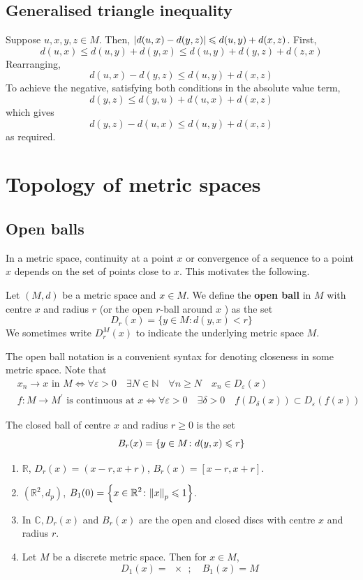 \documentclass[a4paper]{article}
\begin{document}
\subsection{Generalised triangle inequality}
Suppose \( u,x,y,z \in M \).
Then, \( \abs{d(u,x) - d(y,z)} \leqslant d(u,y) + d(x,z) \).
First,
\[
	d(u,x) \leq d(u,y) + d(y,x) \leq d(u,y) + d(y,z) + d(z,x)
\]
Rearranging,
\[
	d(u,x)-d(y,z) \leq d(u,y) + d(x,z)
\]
To achieve the negative, satisfying both conditions in the absolute value term,
\[
	d(y,z) \leq d(y,u) + d(u,x) + d(x,z)
\]
which gives
\[
	d(y,z) - d(u,x) \leq d(u,y) + d(x,z)
\]
as required.

\section{Topology of metric spaces}
\subsection{Open balls}
In a metric space, continuity at a point $x$ or convergence of a sequence to a point $x$ depends on the set of points close to $x$. This motivates the following.
\begin{definition}
	Let $(M, d)$ be a metric space and $x \in M$. We define the \textbf{open ball} in $M$ with centre $x$ and radius $r$ (or the open $r$-ball around $x$ ) as the set
    \[
    D_r(x)=\{y \in M: d(y, x)<r\}
    \]
    We sometimes write $D_r^M(x)$ to indicate the underlying metric space $M$.
\end{definition}
The open ball notation is a convenient syntax for denoting closeness in some metric space.
Note that
\[
    \begin{aligned}
        &x_n \rightarrow x \text { in } M \Longleftrightarrow \forall \varepsilon>0\quad \exists N \in \mathbb{N}\quad \forall n \geqslant N \quad x_n \in D_{\varepsilon}(x) \\
        &f: M \rightarrow M^{\prime} \text { is continuous at } x \Longleftrightarrow \forall \varepsilon>0\quad \exists \delta>0\quad f\left(D_\delta(x)\right) \subset D_{\varepsilon}(f(x))
    \end{aligned}
\]
\begin{definition}
	The closed ball of centre \( x \) and radius \( r \geq 0 \) is the set
	\[
		B_r(x) = \qty{y \in M \colon d(y,x) \leqslant r}
	\]
\end{definition}
\begin{example} 
	\begin{enumerate}
        \item \( \mathbb R \), \( D_r(x) = (x-r,x+r) \),
        \( B_r(x) = [x-r,x+r] \).
        \item \( (\mathbb R^2, d_p) \), $\displaystyle B_1(0) = \left\{ x \in \mathbb R^2 \colon \norm{x}_p \leqslant 1  \right\}$. 
        \item In $\mathbb{C}, D_r(x)$ and $B_r(x)$ are the open and closed discs with centre $x$ and radius $r$.
        \item Let \( M \) be a discrete metric space.
        Then for \( x \in M \),
        \[
            D_1(x) = \qty{x};\quad B_1(x) = M
        \]
    \end{enumerate}
\end{example}
\end{document}
